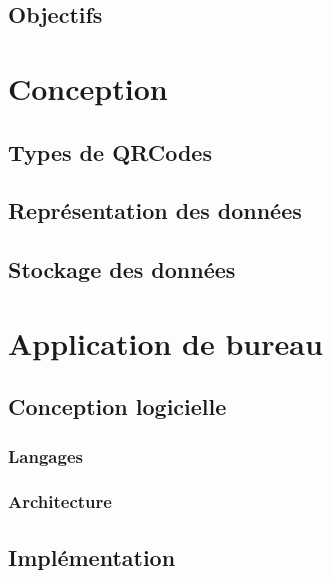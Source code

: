 \documentclass{report}
\begin{document}
	\section{Objectifs}
		 \label{objectifs}


		
\chapter{Conception}

	\section{Types de QRCodes}
		 \label{typesQR}
		
	\newpage
		
	\section{Représentation des données}
		 \label{representationDonnees}
		
	\section{Stockage des données}
		 \label{stockage}
		

\chapter{Application de bureau}

	\section{Conception logicielle}
		
		\subsection{Langages}
			 \label{langages}
			
		\subsection{Architecture}		
			 \label{architecture}
				
	\newpage
	\section{Implémentation}
		
\end{document}
